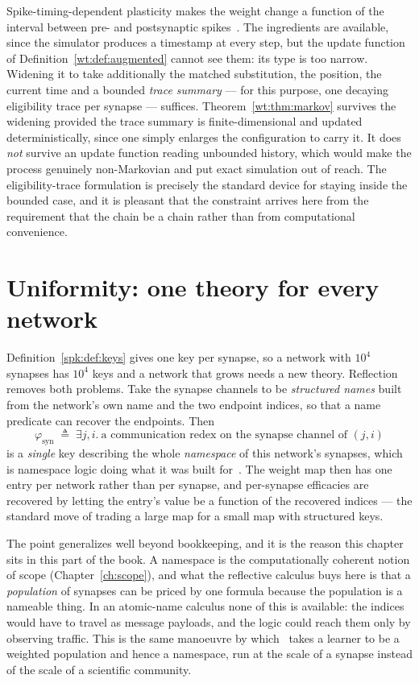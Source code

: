 \begin{remark}
\label{spk:rmk:stdp}
Spike-timing-dependent plasticity makes the weight change a function of the interval
between pre- and postsynaptic spikes~\cite{stdp}. The ingredients are available, since
the simulator produces a timestamp at every step, but the update function of
Definition~\ref{wt:def:augmented} cannot see them: its type is too narrow. Widening it to
take additionally the matched substitution, the position, the current time and a bounded
\emph{trace summary} --- for this purpose, one decaying eligibility trace per synapse ---
suffices. Theorem~\ref{wt:thm:markov} survives the widening provided the trace summary is
finite-dimensional and updated deterministically, since one simply enlarges the
configuration to carry it. It does \emph{not} survive an update function reading unbounded
history, which would make the process genuinely non-Markovian and put exact simulation out
of reach. The eligibility-trace formulation is precisely the standard device for staying
inside the bounded case, and it is pleasant that the constraint arrives here from the
requirement that the chain be a chain rather than from computational convenience.
\end{remark}

\section{Uniformity: one theory for every network}
\label{spk:sec:uniform}

Definition~\ref{spk:def:keys} gives one key per synapse, so a network with $10^4$
synapses has $10^4$ keys and a network that grows needs a new theory. Reflection removes
both problems. Take the synapse channels to be \emph{structured names} built from the
network's own name and the two endpoint indices, so that a name predicate can recover the
endpoints. Then
\[
  \varphi_{\mathrm{syn}} \;\triangleq\;
  \exists j, i.\ \text{a communication redex on the synapse channel of } (j,i)
\]
is a \emph{single} key describing the whole \emph{namespace} of this network's synapses,
which is namespace logic doing what it was built for~\cite{NamespaceLogic}. The weight map
then has one entry per network rather than per synapse, and per-synapse efficacies are
recovered by letting the entry's value be a function of the recovered indices --- the
standard move of trading a large map for a small map with structured keys.

The point generalizes well beyond bookkeeping, and it is the reason this chapter sits in
this part of the book. A namespace is the computationally coherent notion of scope
(Chapter~\ref{ch:scope}), and what the reflective calculus buys here is that a
\emph{population} of synapses can be priced by one formula because the population is a
nameable thing. In an atomic-name calculus none of this is available: the indices would
have to travel as message payloads, and the logic could reach them only by observing
traffic. This is the same manoeuvre by which \chComp\ takes a learner to be a weighted
population and hence a namespace, run at the scale of a synapse instead of the scale of a
scientific community.


